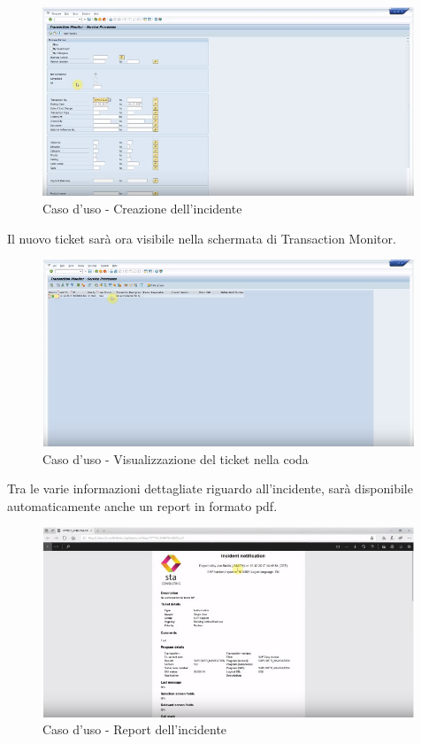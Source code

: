 \begin{figure}[H]
\centering
\includegraphics[width=30em]{immagini/sla/sd3.png}
\caption{Caso d'uso - Creazione dell'incidente}
\end{figure}

Il nuovo ticket sarà ora visibile nella schermata di Transaction Monitor.

\begin{figure}[H]
\centering
\includegraphics[width=30em]{immagini/sla/sd4.png}
\caption{Caso d'uso - Visualizzazione del ticket nella coda}
\end{figure}

Tra le varie informazioni dettagliate riguardo all'incidente, sarà disponibile automaticamente anche un report in formato pdf.

\begin{figure}[H]
\centering
\includegraphics[width=30em]{immagini/sla/sd5.png}
\caption{Caso d'uso - Report dell'incidente}
\end{figure}

